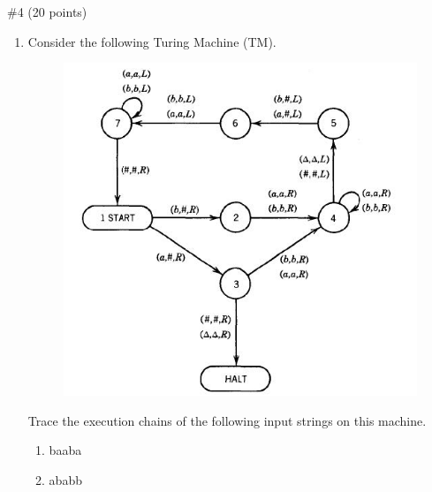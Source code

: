 \begin{problem}{\#4 (20 points)}
    \begin{enumerate}[label=\alph*)]
        \item Consider the following Turing Machine (TM).
        \begin{figure}[H]
            \centering
            \includegraphics[width=0.8\linewidth]{figures/question4.jpg}
        \end{figure}
        Trace the execution chains of the following input strings on this machine.
        \begin{enumerate}[label=\arabic*)]
            \item baaba
            \item ababb
        \end{enumerate}
    \end{enumerate}
\end{problem}

